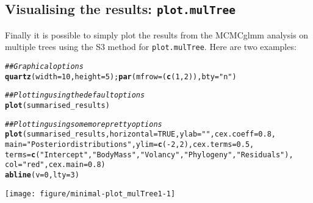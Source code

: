 \documentclass{article}\usepackage[]{graphicx}\usepackage[]{color}
\makeatletter
\newcommand{\hlnum}[1]{\textcolor[rgb]{0.686,0.059,0.569}{#1}}%
\newcommand{\hlstr}[1]{\textcolor[rgb]{0.192,0.494,0.8}{#1}}%
\newcommand{\hlcom}[1]{\textcolor[rgb]{0.678,0.584,0.686}{\textit{#1}}}%
\newcommand{\hlopt}[1]{\textcolor[rgb]{0,0,0}{#1}}%
\newcommand{\hlstd}[1]{\textcolor[rgb]{0.345,0.345,0.345}{#1}}%
\newcommand{\hlkwc}[1]{\textcolor[rgb]{0.333,0.667,0.333}{#1}}%
\newcommand{\hlkwd}[1]{\textcolor[rgb]{0.737,0.353,0.396}{\textbf{#1}}}%
\newenvironment{kframe}{%
 \def\at@end@of@kframe{}%
 \ifinner\ifhmode%
  \def\at@end@of@kframe{\end{minipage}}%
  \begin{minipage}{\columnwidth}%
 \fi\fi%
 \def\FrameCommand##1{\hskip\@totalleftmargin \hskip-\fboxsep
 \colorbox{shadecolor}{##1}\hskip-\fboxsep
     \hskip-\linewidth \hskip-\@totalleftmargin \hskip\columnwidth}%
 \MakeFramed {\advance\hsize-\width
   \@totalleftmargin\z@ \linewidth\hsize
   \@setminipage}}%
 {\par\unskip\endMakeFramed%
 \at@end@of@kframe}
\newenvironment{knitrout}{}{} %
\makeatother
\begin{document}
\newpage

\subsection{Visualising the results: \texttt{plot.mulTree}}
Finally it is possible to simply plot the results from the MCMCglmm analysis on multiple trees using the S3 method for \texttt{plot.mulTree}.
Here are two examples:

\begin{knitrout}
\color{fgcolor}\begin{kframe}
\begin{alltt}
\hlcom{## Graphical options}
\hlkwd{quartz}\hlstd{(}\hlkwc{width} \hlstd{=} \hlnum{10}\hlstd{,} \hlkwc{height} \hlstd{=} \hlnum{5}\hlstd{) ;} \hlkwd{par}\hlstd{(}\hlkwc{mfrow} \hlstd{= (}\hlkwd{c}\hlstd{(}\hlnum{1}\hlstd{,}\hlnum{2}\hlstd{)),} \hlkwc{bty} \hlstd{=} \hlstr{"n"}\hlstd{)}

\hlcom{## Plotting using the default options}
\hlkwd{plot}\hlstd{(summarised_results)}

\hlcom{## Plotting using some more pretty options}
\hlkwd{plot}\hlstd{(summarised_results,} \hlkwc{horizontal} \hlstd{=} \hlnum{TRUE}\hlstd{,} \hlkwc{ylab} \hlstd{=} \hlstr{""}\hlstd{,} \hlkwc{cex.coeff} \hlstd{=} \hlnum{0.8}\hlstd{,}
    \hlkwc{main} \hlstd{=} \hlstr{"Posterior distributions"}\hlstd{,} \hlkwc{ylim} \hlstd{=} \hlkwd{c}\hlstd{(}\hlopt{-}\hlnum{2}\hlstd{,}\hlnum{2}\hlstd{),} \hlkwc{cex.terms} \hlstd{=} \hlnum{0.5}\hlstd{,}
    \hlkwc{terms} \hlstd{=} \hlkwd{c}\hlstd{(}\hlstr{"Intercept"}\hlstd{,} \hlstr{"Body Mass"}\hlstd{,} \hlstr{"Volancy"}\hlstd{,} \hlstr{"Phylogeny"}\hlstd{,} \hlstr{"Residuals"}\hlstd{),}
    \hlkwc{col} \hlstd{=} \hlstr{"red"}\hlstd{,} \hlkwc{cex.main} \hlstd{=} \hlnum{0.8}\hlstd{)}
\hlkwd{abline}\hlstd{(}\hlkwc{v} \hlstd{=} \hlnum{0}\hlstd{,} \hlkwc{lty} \hlstd{=} \hlnum{3}\hlstd{)}
\end{alltt}
\end{kframe}

{\centering \texttt{[image: figure/minimal-plot\_mulTree1-1]} 

}



\end{knitrout}
\end{document}
